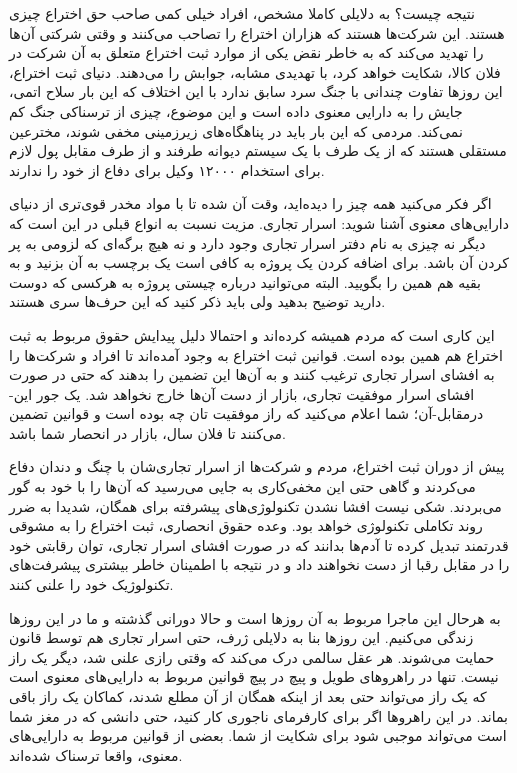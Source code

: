نتیجه چیست؟ به دلایلی کاملا مشخص، افراد خیلی کمی صاحب حق اختراع چیزی
هستند. این شرکت‌ها هستند که هزاران اختراع را تصاحب می‌کنند و وقتی شرکتی
آن‌ها را تهدید می‌کند که به خاطر نقض یکی از موارد ثبت اختراع متعلق به آن
شرکت در فلان کالا، شکایت خواهد کرد، با تهدیدی مشابه، جوابش را
می‌دهند. دنیای ثبت اختراع، این روزها تفاوت چندانی با جنگ سرد سابق ندارد
با این اختلاف که این بار سلاح اتمی، جایش را به دارایی معنوی داده است و
این موضوع، چیزی از ترسناکی جنگ کم نمی‌کند. مردمی که این بار باید در
پناهگاه‌های زیرزمینی مخفی شوند، مخترعین مستقلی هستند که از یک طرف با یک
سیستم دیوانه طرفند و از طرف مقابل پول لازم برای استخدام ۱۲۰۰۰ وکیل
برای دفاع از خود را ندارند.

اگر فکر می‌کنید همه چیز را دیده‌اید، وقت آن شده تا با مواد مخدر قوی‌تری
از دنیای دارایی‌های معنوی آشنا شوید: اسرار تجاری. مزیت  نسبت به انواع قبلی در این است که دیگر نه چیزی به نام دفتر
اسرار تجاری وجود دارد و نه هیچ برگه‌ای که لزومی به پر کردن آن
باشد. برای اضافه کردن یک پروژه به  کافی است یک
برچسب  به آن بزنید و به بقیه هم همین را بگویید. البته
می‌توانید درباره چیستی پروژه به هرکسی که دوست دارید توضیح بدهید ولی
باید ذکر کنید که این حرف‌ها سری هستند.

این کاری است که مردم همیشه کرده‌اند و احتمالا دلیل پیدایش حقوق مربوط به
ثبت اختراع هم همین بوده است. قوانین ثبت اختراع به وجود آمده‌اند تا
افراد و شرکت‌ها را به افشای اسرار تجاری ترغیب کنند و به آن‌ها این تضمین
را بدهند که حتی در صورت افشای اسرار موفقیت تجاری، بازار از دست آن‌ها
خارج نخواهد شد. یک جور این-درمقابل-آن؛ شما اعلام می‌کنید که راز موفقیت
تان چه بوده است و قوانین تضمین می‌کنند تا فلان سال، بازار در انحصار شما
باشد.

پیش از دوران ثبت اختراع، مردم و شرکت‌ها از اسرار تجاری‌شان با چنگ و
دندان دفاع می‌کردند و گاهی حتی این مخفی‌کاری به جایی می‌رسید که آن‌ها را
با خود به گور می‌بردند. شکی نیست افشا نشدن تکنولوژی‌های پیشرفته برای
همگان، شدیدا به ضرر روند تکاملی تکنولوژی خواهد بود. وعده حقوق انحصاری،
ثبت اختراع را به مشوقی قدرتمند تبدیل کرده تا آدم‌ها بدانند که در صورت
افشای اسرار تجاری، توان رقابتی خود را در مقابل رقبا از دست نخواهند داد
و در نتیجه با اطمینان خاطر بیشتری پیشرفت‌های تکنولوژیک خود را علنی
کنند.

به هرحال این ماجرا مربوط به آن روزها است و حالا دورانی گذشته و ما در
این روزها زندگی می‌کنیم. این روزها بنا به دلایلی ژرف، حتی اسرار تجاری
هم توسط قانون حمایت می‌شوند. هر عقل سالمی درک می‌کند که وقتی رازی علنی
شد، دیگر یک راز نیست. تنها در راهروهای طویل و پیچ در پیچ قوانین مربوط
به دارایی‌های معنوی است که یک راز می‌تواند حتی بعد از اینکه همگان از آن
مطلع شدند، کماکان یک راز باقی بماند. در این راهروها اگر برای کارفرمای
ناجوری کار کنید، حتی دانشی که در مغز شما است می‌تواند موجبی شود برای
شکایت از شما. بعضی از قوانین مربوط به دارایی‌های معنوی، واقعا ترسناک
شده‌اند.


